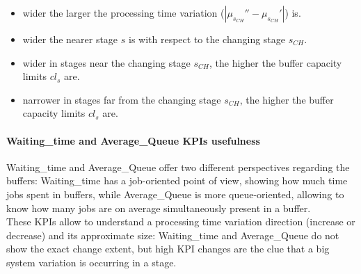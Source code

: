 \begin{itemize}
\item wider the larger the processing time variation ($|\mu_{s_{CH}}''-\mu_{s_{CH}}'|$) is.
\item wider the nearer stage $s$ is with respect to the changing stage $s_{CH}$.
\item wider in stages near the changing stage $s_{CH}$, the higher the buffer capacity limits $cl_s$ are.
\item narrower in stages far from the changing stage $s_{CH}$, the higher the buffer capacity limits $cl_s$ are.
\end{itemize}
\paragraph{Waiting\_time and Average\_Queue KPIs usefulness}
Waiting\_time and Average\_Queue offer two different perspectives regarding the buffers: Waiting\_time has a job-oriented point of view, showing how much time jobs spent in buffers, while Average\_Queue is more queue-oriented, allowing to know how many jobs are on average simultaneously present in a buffer.\\
These KPIs allow to understand a processing time variation direction (increase or decrease) and its approximate size: Waiting\_time and Average\_Queue do not show the exact change extent, but high KPI changes are the clue that a big system variation is occurring in a stage.
